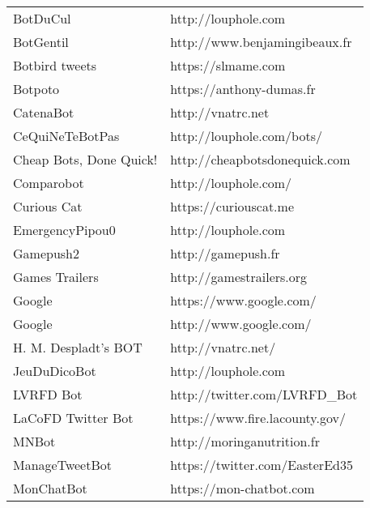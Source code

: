 \begin{tabular}{ll}

                  BotDuCul &                               http://louphole.com  \\
                 BotGentil &                     http://www.benjamingibeaux.fr  \\
            Botbird tweets &                                https://slmame.com  \\
                   Botpoto &                          https://anthony-dumas.fr  \\
                 CatenaBot &                                 http://vnatrc.net  \\
           CeQuiNeTeBotPas &                         http://louphole.com/bots/  \\
   Cheap Bots, Done Quick! &                     http://cheapbotsdonequick.com  \\
                Comparobot &                              http://louphole.com/  \\
               Curious Cat &                             https://curiouscat.me  \\
           EmergencyPipou0 &                               http://louphole.com  \\
                 Gamepush2 &                                http://gamepush.fr  \\
            Games Trailers &                          http://gamestrailers.org  \\
                    Google &                           https://www.google.com/  \\
                    Google &                            http://www.google.com/  \\
      H. M. Despladt's BOT &                                http://vnatrc.net/  \\
              JeuDuDicoBot &                               http://louphole.com  \\
                 LVRFD Bot &                      http://twitter.com/LVRFD\_Bot  \\
        LaCoFD Twitter Bot &                    https://www.fire.lacounty.gov/  \\
                     MNBot &                        http://moringanutrition.fr  \\
            ManageTweetBot &                    https://twitter.com/EasterEd35  \\
                MonChatBot &                           https://mon-chatbot.com  \\

\end{tabular}
